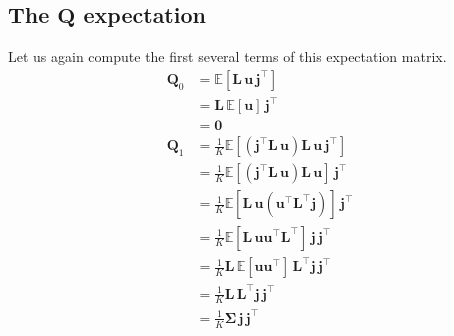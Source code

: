 \subsection{The $\mathbf{Q}$ expectation}
%
Let us again compute the first several terms of this expectation matrix.
%
\begin{align}
    \mathbf{Q}_0 & = \mathbb{E}\left[ \mathbf{L} \, \mathbf{u} \, \mathbf{j}^\top \right]
    \nonumber                                                                                                                                              \\
                 & = \mathbf{L} \, \mathbb{E}\left[  \mathbf{u} \right] \, \mathbf{j}^\top
    \nonumber                                                                                                                                              \\
                 & = \mathbf{0}
    \\[1em]
    \mathbf{Q}_1 & = \frac{1}{K}\mathbb{E}\left[ \left(\mathbf{j}^\top \mathbf{L} \, \mathbf{u}\right) \mathbf{L} \, \mathbf{u} \, \mathbf{j}^\top \right]
    \nonumber                                                                                                                                              \\
                 & = \frac{1}{K}\mathbb{E}\left[ \left(\mathbf{j}^\top \mathbf{L} \, \mathbf{u}\right) \mathbf{L} \, \mathbf{u} \right] \, \mathbf{j}^\top
    \nonumber                                                                                                                                              \\
                 & = \frac{1}{K}\mathbb{E}\left[ \mathbf{L} \, \mathbf{u} (\mathbf{u}^\top \mathbf{L}^\top \mathbf{j}) \right] \, \mathbf{j}^\top
    \nonumber                                                                                                                                              \\
                 & = \frac{1}{K}\mathbb{E}\left[ \mathbf{L} \, \mathbf{u} \mathbf{u}^\top \mathbf{L}^\top  \right] \, \mathbf{j} \, \mathbf{j}^\top
    \nonumber                                                                                                                                              \\
                 & = \frac{1}{K}\mathbf{L} \, \mathbb{E}\left[  \mathbf{u} \mathbf{u}^\top   \right]  \, \mathbf{L}^\top \mathbf{j} \, \mathbf{j}^\top
    \nonumber                                                                                                                                              \\
                 & = \frac{1}{K}\mathbf{L} \, \mathbf{L}^\top \mathbf{j} \, \mathbf{j}^\top
    \nonumber                                                                                                                                              \\
                 & = \frac{1}{K}\pmb{\Sigma} \, \mathbf{j} \, \mathbf{j}^\top
\end{align}
